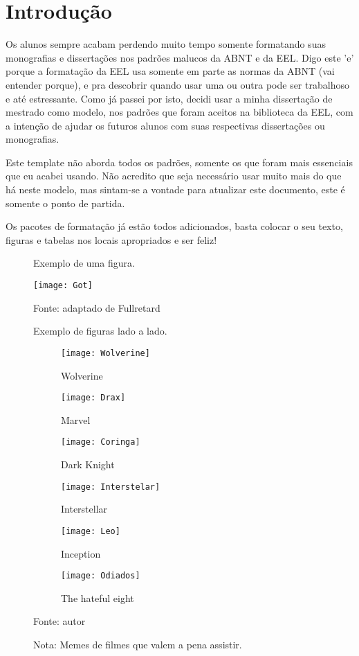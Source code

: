 \chapter{Introdução}

Os alunos sempre acabam perdendo muito tempo somente formatando suas monografias e dissertações nos padrões malucos da ABNT e da EEL. Digo este 'e' porque a formatação da EEL usa somente em parte as normas da ABNT (vai entender porque), e pra descobrir quando usar uma ou outra pode ser trabalhoso e até estressante. Como já passei por isto, decidi usar a minha dissertação de mestrado como modelo, nos padrões que foram aceitos na biblioteca da EEL, com a intenção de ajudar os futuros alunos com suas respectivas dissertações ou monografias. 

Este template não aborda todos os padrões, somente os que foram mais essenciais que eu acabei usando. Não acredito que seja necessário usar muito mais do que há neste modelo, mas sintam-se a vontade para atualizar este documento, este é somente o ponto de partida. 

Os pacotes de formatação já estão todos adicionados, basta colocar o seu texto, figuras e tabelas nos locais apropriados e ser feliz! 

\begin{figure}
	\centering
	\caption{Exemplo de uma figura.}
	\texttt{[image: Got]}
	\label{Selecione_um_label_para_chamar_no_texto_com_o_comando_ref{}.}
	\raggedright
	\caption*{Fonte: adaptado de Fullretard}
\end{figure}


\begin{figure}
	\centering
	\caption{Exemplo de figuras lado a lado.}
	\begin{subfigure}[t]{0.5\textwidth}
		\caption{Wolverine}
		\centering
		\texttt{[image: Wolverine]}
	\end{subfigure}%
	\begin{subfigure}[t]{0.5\textwidth}
		\caption{Marvel}
		\centering
		\texttt{[image: Drax]}
	\end{subfigure}
	\begin{subfigure}[t]{0.5\textwidth}
		\caption{Dark Knight}
		\centering
		\texttt{[image: Coringa]}
	\end{subfigure}%
	\begin{subfigure}[t]{0.5\textwidth}
		\caption{Interstellar}
		\centering
		\texttt{[image: Interstelar]}
	\end{subfigure}
	
	\begin{subfigure}[t]{0.5\textwidth}
		\caption{Inception}
		\centering
		\texttt{[image: Leo]}
	\end{subfigure}%
	\begin{subfigure}[t]{0.5\textwidth}
		\caption{The hateful eight}
		\centering		
		\texttt{[image: Odiados]}
	\end{subfigure}
	\label{fig:mev1}
	\caption*{Fonte: autor}
	\caption*{Nota: Memes de filmes que valem a pena assistir.}
\end{figure}

